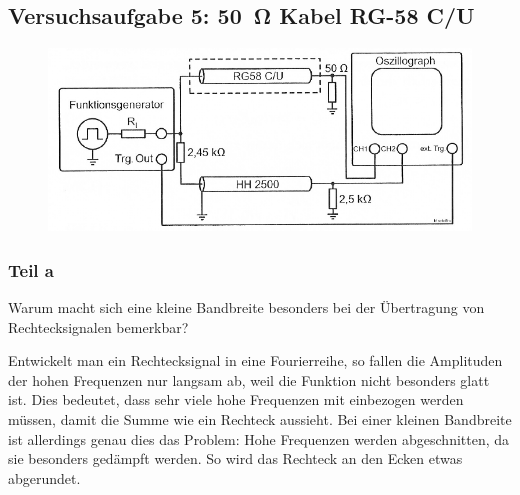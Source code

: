 \FloatBarrier
\subsection{Versuchsaufgabe 5: \SI{50}{\ohm} Kabel RG-58 C/U}

\begin{figure}
	\centering
	\includegraphics[width=\textwidth]{Schaltplan/1-11.png}
	\caption{%
		\cite[Abbildung~1.11]{physik313-Anleitung}
	}
	\label{fig:1-11}
\end{figure}

\subsubsection{Teil a}

\begin{problem}
	Warum macht sich eine kleine Bandbreite besonders bei der Übertragung von
	Rechtecksignalen bemerkbar?
\end{problem}

Entwickelt man ein Rechtecksignal in eine Fourierreihe, so fallen die
Amplituden der hohen Frequenzen nur langsam ab, weil die Funktion nicht
besonders glatt ist. Dies bedeutet, dass sehr viele hohe Frequenzen mit
einbezogen werden müssen, damit die Summe wie ein Rechteck aussieht. Bei einer
kleinen Bandbreite ist allerdings genau dies das Problem: Hohe Frequenzen
werden abgeschnitten, da sie besonders gedämpft werden. So wird das Rechteck an
den Ecken etwas abgerundet.

